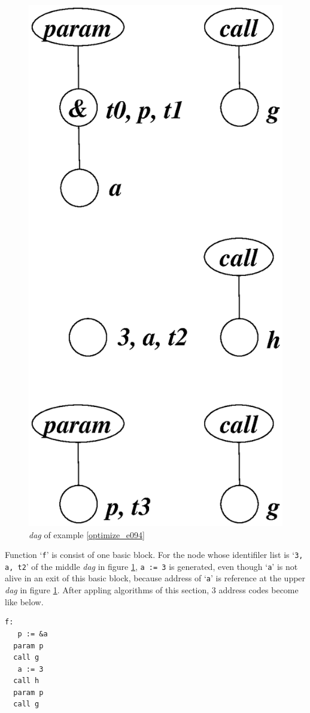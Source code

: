 \begin{Example}
\begin{figure}[htbp]
\begin{center}
\begin{latexonly}
\includegraphics[width=0.496\linewidth,height=1.0\linewidth]{opt041.eps}
\end{latexonly}
\caption{{\em dag} of example \ref{optimize_e094}}
\label{optimize_e095}
\end{center}
\end{figure}
Function `{\tt{f}}' is consist of one basic block.
For the node whose identifiler list is `{\tt{3, a, t2}}' of the
middle {\em dag} in figure \ref{optimize_e095},
{\tt{a := 3}} is generated, even though `{\tt{a}}' is
not alive in an exit of this basic block,
because address of `{\tt{a}}' is reference at the upper {\em dag} 
in figure \ref{optimize_e095}.
After appling algorithms of this section,
3 address codes become like below.
\begin{verbatim}
f:
   p := &a
  param p
  call g
   a := 3
  call h
  param p
  call g
\end{verbatim}
\end{Example}

